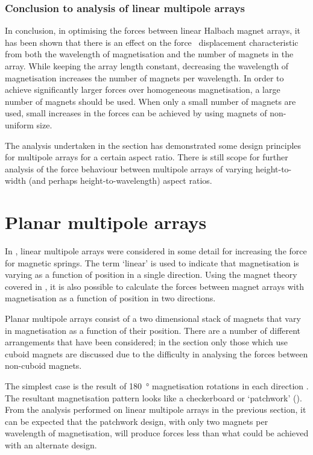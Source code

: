 \documentclass[11pt,a4paper]{memoir}
\begin{document}
\subsubsection{Conclusion to analysis of linear multipole arrays}

In conclusion, in optimising the forces between linear Halbach magnet arrays, it has been shown that there is an effect on the force \vs\ displacement characteristic from both the wavelength of magnetisation and the number of magnets in the array.
While keeping the array length constant, decreasing the wavelength of magnetisation increases the number of magnets per wavelength.
In order to achieve significantly larger forces over homogeneous magnetisation, a large number of magnets should be used.
When only a small number of magnets are used, small increases in the forces can be achieved by using magnets of non-uniform size.

The analysis undertaken in the section has demonstrated some design principles for multipole arrays for a certain aspect ratio.
There is still scope for further analysis of the force behaviour between multipole arrays of varying height-to-width (and perhaps height-to-wavelength) aspect ratios.


\section{Planar multipole arrays}

In , linear multipole arrays were considered in some detail for increasing the force for magnetic springs.
The term `linear' is used to indicate that magnetisation is varying as a function of position in a single direction.
Using the magnet theory covered in , it is also possible to calculate the forces between magnet arrays with magnetisation as a function of position in two directions.

Planar multipole arrays consist of a two dimensional stack of magnets that vary in magnetisation as a function of their position.
There are a number of different arrangements that have been considered; in the section only those which use cuboid magnets are discussed due to the difficulty in analysing the forces between non-cuboid magnets.

The simplest case is the result of \SI{180}{\degree} magnetisation rotations in each direction \cite{kim1997-thesis,cho2001}.
The resultant magnetisation pattern looks like a checkerboard or `patchwork' ().
From the analysis performed on linear multipole arrays in the previous section, it can be expected that the patchwork design, with only two magnets per wavelength of magnetisation, will produce forces less than what could be achieved with an alternate design.
\end{document}
